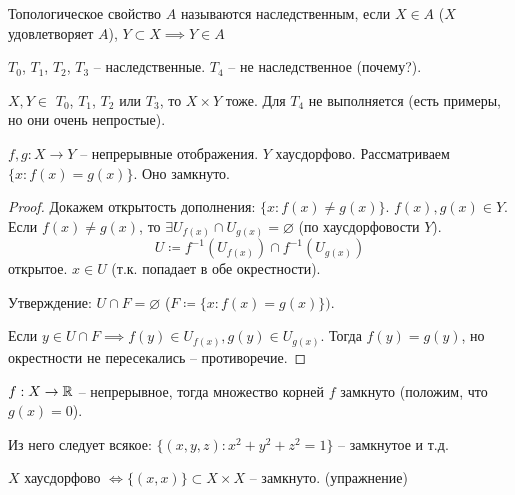 \documentclass[main]{subfiles}
\begin{document}
\begin{definition}
    Топологическое свойство $A$ называются наследственным, если $X \in A$ ($X$ удовлетворяет $A$),
    $Y \subset X \implies Y \in A$
\end{definition}
\begin{example}
    $T_0$, $T_1$, $T_2$, $T_3$ -- наследственные.
    $T_4$ -- не наследственное (почему?).
\end{example}
\begin{remark}
    $X,Y \in$ $T_0$, $T_1$, $T_2$ или $T_3$, то $X \times Y$ тоже.
    Для $T_4$ не выполняется (есть примеры, но они очень непростые).
\end{remark}

\begin{theorem}
    $f, g: X \to Y$ -- непрерывные отображения. $Y$ хаусдорфово.
    Рассматриваем $\{x: f(x) = g(x)\}$. Оно замкнуто.
\end{theorem}
\begin{proof}
    Докажем открытость дополнения: $\{x: f(x) \neq g(x)\}$.
    $f(x), g(x) \in Y$.
    Если $f(x) \neq g(x)$, то $\exists U_{f(x)} \cap U_{g(x)} = \varnothing$ (по хаусдорфовости $Y$).
    \[U \coloneqq f^{-1}(U_{f(x)}) \cap f^{-1}(U_{g(x)})\]
    открытое.
    $x \in U$ (т.к. попадает в обе окрестности).

    Утверждение: $U \cap F = \varnothing$ ($F \coloneqq\{x: f(x) = g(x)\})$.

    Если $y \in U \cap F \implies f(y) \in U_{f(x)}, g(y)\in U_{g(x)}$.
    Тогда $f(y) = g(y)$, но окрестности не пересекались -- противоречие.
\end{proof}
\begin{corollary}
    $f: X \to \mathbb{R}$ -- непрерывное, тогда множество корней $f$ замкнуто (положим, что $g(x) = 0$).
\end{corollary}

Из него следует всякое:
$\{(x,y,z): x^2 + y^2 +z^2 =1\}$ -- замкнутое и т.д.

\begin{remark}
    $X$ хаусдорфово $\Leftrightarrow \{(x,x)\} \subset X \times X$ -- замкнуто. (упражнение)
\end{remark}
\end{document}
